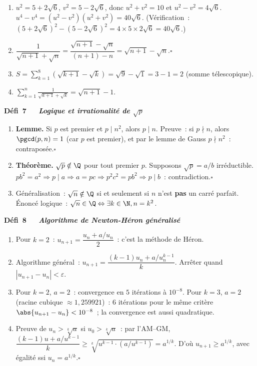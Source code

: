 \begin{enumerate}
  \item $u^2=5+2\sqrt6$, $v^2=5-2\sqrt6$, donc $u^2+v^2=10$ et $u^2-v^2=4\sqrt6$.
        $u^4-v^4=(u^2-v^2)(u^2+v^2)=40\sqrt6$. (V\'erification~: $(5+2\sqrt6)^2-(5-2\sqrt6)^2=4\times5\times2\sqrt6=40\sqrt6$.)
  \item $\dfrac1{\sqrt{n+1}+\sqrt n}=\dfrac{\sqrt{n+1}-\sqrt n}{(n+1)-n}=\sqrt{n+1}-\sqrt n$.\hfill$\square$
  \item $S=\sum_{k=1}^{8}\left(\sqrt{k+1}-\sqrt k\right)=\sqrt9-\sqrt1=3-1=2$ (somme t\'elescopique).
  \item $\displaystyle\sum_{k=1}^{n}\frac1{\sqrt{k+1}+\sqrt k}=\sqrt{n+1}-1$.
\end{enumerate}
\noindent{}
{\color{BO}\bfseries\small D\'efi~7~\textendash\ \textit{\logiq\ Logique et irrationalit\'e de $\sqrt{p}$}}
\par\smallskip

\begin{enumerate}
  \item \textbf{Lemme.} Si $p$ est premier et $p\mid n^2$, alors $p\mid n$.
        Preuve~: si $p\nmid n$, alors $\pgcd(p,n)=1$ (car $p$ est premier),
        et par le lemme de Gauss $p\nmid n^2$~: contrapos\'ee.\hfill$\square$
  \item \textbf{Th\'eor\`eme.} $\sqrt{p}\notin\Q$ pour tout premier $p$.
        Supposons $\sqrt{p}=a/b$ irr\'eductible.
        $p b^2=a^2 \Rightarrow p\mid a \Rightarrow a=pc \Rightarrow p^2c^2=pb^2
        \Rightarrow p\mid b$~: contradiction.\hfill$\square$
  \item G\'en\'eralisation~: $\sqrt{n}\notin\Q$ si et seulement si
        $n$ n'est \textbf{pas} un carr\'e parfait.
        \'Enonc\'e logique~: $\sqrt{n}\in\Q \Leftrightarrow \exists k\in\N, n=k^2$.
\end{enumerate}

\noindent{}
{\color{BO}\bfseries\small D\'efi~8~\textendash\ \textit{\algo\ Algorithme de Newton-H\'eron g\'en\'eralis\'e}}
\par\smallskip

\begin{enumerate}
  \item Pour $k=2$~: $u_{n+1}=\dfrac{u_n+a/u_n}{2}$~: c'est la m\'ethode de H\'eron.\checkmark
  \item Algorithme g\'en\'eral~: $u_{n+1}=\dfrac{(k-1)u_n+a/u_n^{k-1}}{k}$.
        Arr\^eter quand $|u_{n+1}-u_n|<\varepsilon$.
  \item Pour $k=2$, $a=2$~: convergence en $5$ it\'erations \`a $10^{-8}$.
        Pour $k=3$, $a=2$ (racine cubique $\approx1{,}259921$)~: $6$ it\'erations pour le m\^eme crit\`ere $\abs{u_{n+1}-u_n}<10^{-8}$~; la convergence est aussi quadratique.
  \item Preuve de $u_n>\sqrt[k]{a}$ si $u_0>\sqrt[k]{a}$~:
        par l'AM--GM, $\dfrac{(k-1)u+a/u^{k-1}}{k}\geq \sqrt[k]{u^{k-1}\cdot(a/u^{k-1})}=a^{1/k}$.
        D'o\`u $u_{n+1}\geq a^{1/k}$, avec \'egalit\'e ssi $u_n=a^{1/k}$.\hfill$\square$
\end{enumerate}


